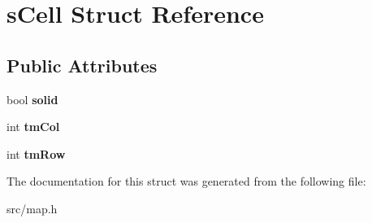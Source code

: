 \hypertarget{structs_cell}{}\section{s\+Cell Struct Reference}
\label{structs_cell}
\subsection*{Public Attributes}
\begin{DoxyCompactItemize}
\item 
\mbox{\label{structs_cell_a90b2c92058cb2d74bf469dfc87321f5d}} 
bool {\bfseries solid}
\item 
\mbox{\label{structs_cell_ab6eea334d31343fd522b0ffa66441902}} 
int {\bfseries tm\+Col}
\item 
\mbox{\label{structs_cell_ae9174392fe9f6e3500f8c5128995af31}} 
int {\bfseries tm\+Row}
\end{DoxyCompactItemize}


The documentation for this struct was generated from the following file\+:\begin{DoxyCompactItemize}
\item 
src/map.\+h\end{DoxyCompactItemize}
